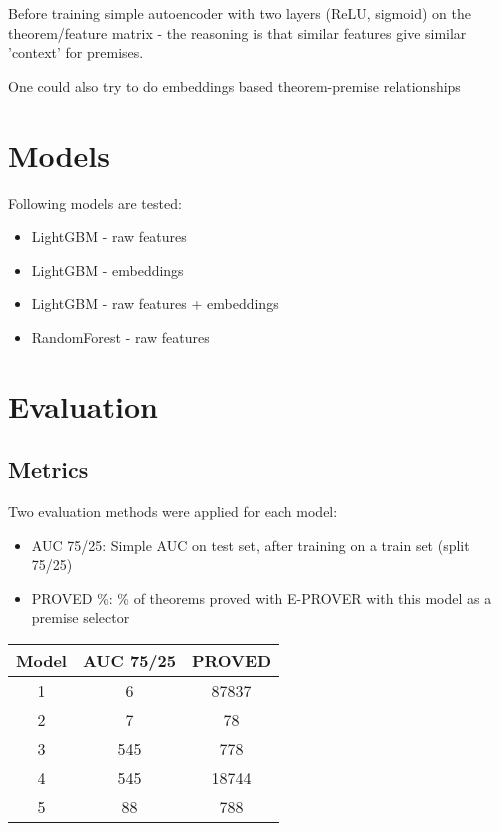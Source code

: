 \documentclass{article} %
\begin{document}
Before training simple autoencoder with two layers (ReLU, sigmoid) on the theorem/feature matrix - the reasoning is that similar features give similar 'context' for premises.

One could also try to do embeddings based theorem-premise relationships

\section{Models}

Following models are tested:
\begin{itemize}

\item LightGBM - raw features
\item LightGBM - embeddings
\item LightGBM - raw features + embeddings
\item RandomForest - raw features
\end{itemize}



\section{Evaluation}

\subsection{Metrics}

Two evaluation methods were applied for each model:

\begin{itemize}
\item AUC 75/25: Simple AUC on test set, after training on a train set (split 75/25)
\item PROVED \%: \% of theorems proved with E-PROVER with this model as a premise selector
\end{itemize}


\begin{center}
 \begin{tabular}{||c | c | c||} 
 \hline
 Model & AUC 75/25 & PROVED \\ [0.5ex] 
 \hline\hline
 1 & 6 & 87837 \\ 
 \hline
 2 & 7 & 78 \\
 \hline
 3 & 545 & 778 \\
 \hline
 4 & 545 & 18744\\
 \hline
 5 & 88 & 788 \\ [1ex] 
 \hline
\end{tabular}
\end{center}
\end{document}

